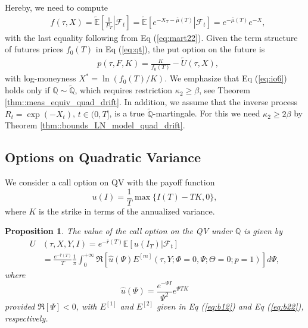\documentclass[11pt,a4paper] {article}
\newtheorem{proposition}{Proposition}[section]
\begin{document}
Hereby, we need to compute
\begin{equation} \label{eq:io7}
\begin{split}
  & f(\tau, X) = \mathbb{\tilde{E}}\left[\left.\frac{1}{P_{T}}\right|\mathcal{F}_{t}\right]=
  \mathbb{\tilde{E}}\left[\left.e^{-X_T-\overline{\mu}(T)}\right|\mathcal{F}_{t}\right]=
  e^{-\overline{\mu}(T)}e^{-X},
\end{split}
\end{equation}
with the last equality following from Eq (\ref{eq:mart22}). Given the term structure of futures prices $f_{0}(T)$ in Eq (\ref{eq:qt}), the put option on the future is
\begin{equation} \label{eq:io10}
\begin{split}
  & p(\tau, F,K) =   \frac{K}{f_{0}(T)}- \widetilde{U}(\tau, X),
\end{split} 
\end{equation}
with log-moneyness $X^{*}=\ln(f_{0}(T)/K)$. 
We emphasize that Eq (\ref{eq:io6}) holds only if $\mathbb{Q}\sim \tilde{\mathbb{Q}}$, which requires restriction $\kappa_2\ge \beta$, see Theorem \ref {thm::meas_equiv_quad_drift}. 
In addition, we assume that the inverse process $R_t=\exp(-X_t)$, $t\in(0,T]$, is a true $\tilde{\mathbb{Q}}$-martingale. For this we need $\kappa_2\ge 2\beta$ by Theorem \ref{thm::bounds_LN_model_quad_drift}.



\subsection{Options on Quadratic Variance}

We consider a call option on QV with the payoff function
\begin{equation}\label{eq:qv0}
u(I)=\frac{1}{T}\max\{I(T)-TK,0\},
\end{equation}
where $K$ is the strike in terms of the annualized variance.


\begin{proposition}\label{qmma} The value of the call option on the QV under $\mathbb{Q}$ is given by
\begin{equation}\label{eq:qv1}
\begin{split}
U&(\tau,X,Y,I)=e^{-\bar{r}(T)}\mathbb{E}\left[\left.u(I_T)\right|\mathcal{F}_{t}\right]\\
& =\frac{e^{-\bar{r}(T)}}{T}\frac{1}{\pi}\int_0^{+\infty}\Re\left[\hat{u}(\Psi) E^{[m]}(\tau,Y; \Phi=0,\Psi;\Theta=0;p=1)\right]d\Psi,
\end{split}
\end{equation}
where
\begin{equation}\label{eq:qv1a}
\hat{u}(\Psi)=\frac{e^{-\Psi I}}{\Psi^2}e^{\Psi TK}
\end{equation}
provided $\Re[\Psi]<0$, with $E^{[1]}$ and $E^{[2]}$ given in Eq (\ref{eq:b12}) and Eq (\ref{eq:b22}), respectively.
\end{proposition}
\end{document}
